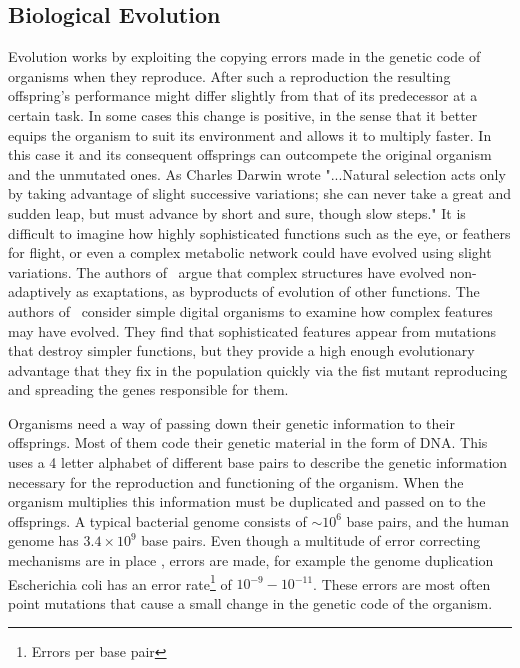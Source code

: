 \documentclass[a4paper,12pt]{article}
\begin{document}
	
	\subsection{Biological Evolution}\label{chap:evolution}
	
	Evolution works by exploiting the copying errors made in the genetic code of organisms when they reproduce. After such a reproduction the resulting offspring's performance might differ slightly from that of its predecessor at a certain task. In some cases this change is positive, in the sense that it better equips the organism to suit its environment and allows it to multiply faster. In this case it and its consequent offsprings can outcompete the original organism and the unmutated ones. As Charles Darwin wrote "...Natural selection acts only by taking advantage of slight successive variations; she can never take a great and sudden leap, but must advance by short and sure, though slow steps." \cite{darwin} 
	It is difficult to imagine how highly sophisticated functions such as the eye, or feathers for flight, or even a complex metabolic network could have evolved using slight variations. The authors of~\cite{latent} argue that complex structures have evolved non-adaptively as exaptations, as byproducts of evolution of other functions. The authors of~\cite{complexfeatures} consider simple digital organisms to examine how complex features may have evolved. They find that sophisticated features appear from mutations that destroy simpler functions, but they provide a high enough evolutionary advantage that they fix in the population quickly via the fist mutant reproducing and spreading the genes responsible for them. 
	

	Organisms need a way of passing down their genetic information to their offsprings. 
	Most of them code their genetic material in the form of DNA. This uses a 4 letter alphabet of different base pairs to describe the genetic information necessary for the reproduction and functioning of the organism. When the organism multiplies this information must be duplicated and passed on to the offsprings. A typical bacterial genome consists of $\sim 10^6$ base pairs, and the human genome has $3.4 \times 10^9$ base pairs. Even though a multitude of error correcting mechanisms are in place \cite{dnarepair}, errors are made, for example the genome duplication Escherichia coli has an error rate\footnote{Errors per base pair} of $10^{-9} - 10^{-11}$\cite{ecolierrorrate}. These errors are most often point mutations that cause a small change in the genetic code of the organism.
	
\end{document}
